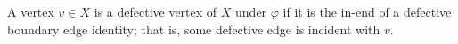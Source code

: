 \begin{definition}
A vertex $v\in X$ is a defective vertex of $X$ under $\varphi$ if it is
the in-end of a defective boundary edge identity; that is, some defective
edge is incident with $v$.
\end{definition}
